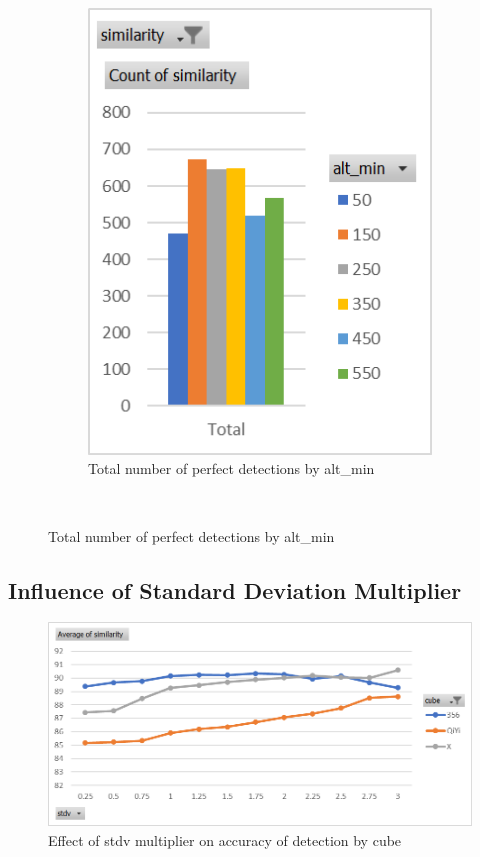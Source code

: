 \begin{figure}
\begin{subfigure}{\textwidth}
    \centering
    \caption{Total number of perfect detections by alt\_min}
    \label{fig:perfect-detections-by-alt-min}
    \includegraphics[width=0.75\linewidth]{Figures/7 Evaluation/perfect_detections_by_alt_min.png}
\end{subfigure}\\
\end{figure}

\subsection{Influence of Standard Deviation Multiplier}

\begin{figure}[h]
    \centering
    \caption{Effect of stdv multiplier on accuracy of detection by cube}
    \label{fig:similarity-by-cube}
    \includegraphics[width=0.75\linewidth]{Figures/7 Evaluation/similarity_by_cube.png}
\end{figure}

